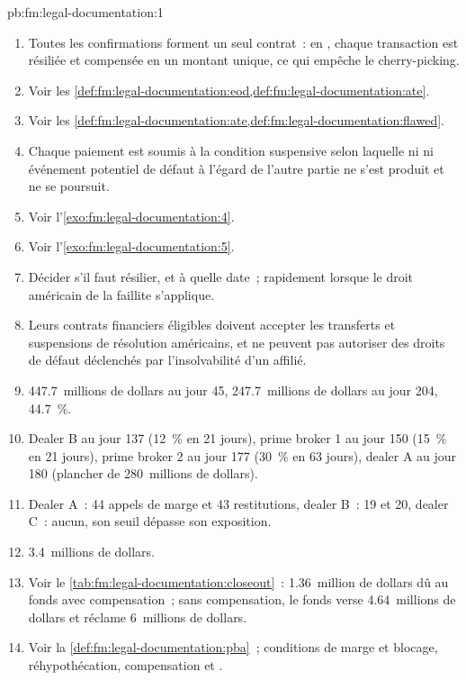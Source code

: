 \begin{solution}{pb:fm:legal-documentation:1}
\begin{enumerate}
\item Toutes les confirmations forment un seul contrat~: en , chaque transaction est résiliée et compensée en un montant unique,
ce qui empêche le cherry-picking.
\item Voir les \cref{def:fm:legal-documentation:eod,def:fm:legal-documentation:ate}.
\item Voir les \cref{def:fm:legal-documentation:ate,def:fm:legal-documentation:flawed}.
\item Chaque paiement est soumis à la condition suspensive selon laquelle ni  ni événement potentiel de défaut à l'égard de l'autre partie
ne s'est produit et ne se poursuit.
\item Voir l'\cref{exo:fm:legal-documentation:4}.
\item Voir l'\cref{exo:fm:legal-documentation:5}.
\item Décider s'il faut résilier, et à quelle date~; rapidement lorsque le droit américain de la faillite s'applique.
\item Leurs contrats financiers éligibles doivent accepter les transferts et suspensions de résolution américains, et ne peuvent pas autoriser des droits de défaut déclenchés par
l'insolvabilité d'un affilié.
\item 447.7~millions de dollars au jour 45, 247.7~millions de dollars au jour 204, 44.7~\%.
\item Dealer B au jour 137 (12~\% en 21 jours), prime broker 1 au jour 150 (15~\% en 21 jours), prime broker 2 au jour 177 (30~\% en 63 jours), dealer A au jour 180
(plancher de 280~millions de dollars).
\item Dealer A~: 44 appels de marge et 43 restitutions, dealer B~: 19 et 20, dealer C~: aucun, son seuil dépasse son exposition.
\item 3.4~millions de dollars.
\item Voir le \cref{tab:fm:legal-documentation:closeout}~: 1.36~million de dollars dû au fonds avec compensation~; sans compensation, le fonds verse 4.64~millions de dollars et
réclame 6~millions de dollars.
\item Voir la \cref{def:fm:legal-documentation:pba}~; conditions de marge et blocage, réhypothécation, compensation et .

\end{enumerate}
\end{solution}
